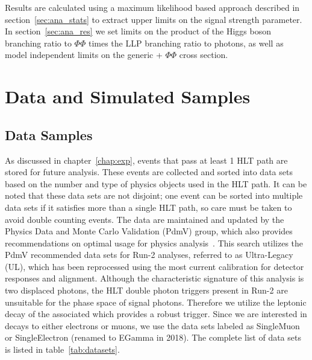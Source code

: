 Results are calculated using a maximum likelihood based approach described in section~\ref{sec:ana_stats} to extract upper limits on the signal strength parameter. In section~\ref{sec:ana_res} we set limits on the product of the Higgs boson branching ratio to $\Phi\Phi$ times the LLP branching ratio to photons, as well as model independent limits on the generic \VZ + $\Phi\Phi$ cross section.

\section{Data and Simulated Samples} \label{sec:ana_samples}

\subsection{Data Samples} \label{sec:ana_data}
As discussed in chapter~\ref{chap:exp}, events that pass at least 1 HLT path are stored for future analysis. These events are collected and sorted into data sets based on the number and type of physics objects used in the HLT path. It can be noted that these data sets are not disjoint; one event can be sorted into multiple data sets if it satisfies more than a single HLT path, so care must be taken to avoid double counting events. The data are maintained and updated by the Physics Data and Monte Carlo Validation (PdmV) group, which also provides recommendations on optimal usage for physics analysis~\cite{pdmv}. This search utilizes the PdmV recommended data sets for Run-2 analyses, referred to as Ultra-Legacy (UL), which has been reprocessed using the most current calibration for detector responses and alignment. Although the characteristic signature of this analysis is two displaced photons, the HLT double photon triggers present in Run-2 are unsuitable for the phase space of signal photons. Therefore we utilize the leptonic decay of the associated \VZ which provides a robust trigger. Since we are interested in \VZ decays to either electrons or muons, we use the data sets labeled as SingleMuon or SingleElectron (renamed to EGamma in 2018). The complete list of data sets is listed in table~\ref{tab:datasets}.

